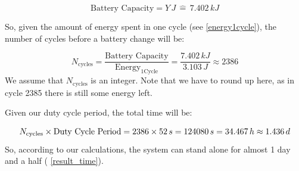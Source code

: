 \documentclass{article}
\begin{document}
\begin{equation}
    \text{Battery Capacity} = Y\,J \,\widehat{=}\, 7.402\,kJ
\end{equation}

\noindent So, given the amount of energy spent in one cycle (see \autoref{energy1cycle}), the number of cycles before a battery change will be:

\begin{equation}
    N_{\text{cycles}} = \frac{\text{Battery Capacity}}{\text{Energy}_{\text{1Cycle}}}
    = \frac{7.402\,kJ}{3.103\,J} \approx 2386
\end{equation}
We assume that $N_{\text{cycles}}$ is an integer.
Note that we have to round up here, as in cycle 2385 there is still some energy left.

\noindent Given our duty cycle period, the total time will be:

\begin{equation} \label{result_time}
     N_{\text{cycles}} \times \text{Duty Cycle Period} = 2386 \times 52\,s \\= 124080\,s = 34.467\,h \approx 1.436\,d 
\end{equation}
So, according to our calculations, the system can stand alone for almost 1 day and a half ( \autoref{result_time}).
\end{document}
